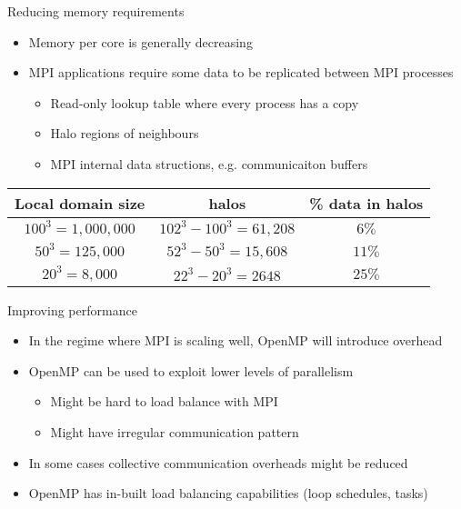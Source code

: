 \documentclass[aspectratio=43]{beamer}
\begin{document}
\begin{frame}[fragile]{Reducing memory requirements}
\begin{itemize}
\item Memory per core is generally decreasing
\item MPI applications require some data to be replicated between MPI processes 
 \begin{itemize}
        \item Read-only lookup table where every process has a copy
        \item Halo regions of neighbours          
        \item MPI internal data structions, e.g. communicaiton buffers
    \end{itemize}
\end{itemize}
\begin{center}
\begin{tabular}{|c|c|c|}
\hline
Local domain size &  halos & \% data in halos\\\hline
$100^3 = 1,000,000$  & $102^3 - 100^3 = 61,208$ & $6\%$\\\hline
$50^3 = 125,000$  &  $52^3 - 50^3 = 15,608$ & $11\%$ \\\hline
$20^3 = 8,000$  & $22^3 - 20^3 = 2648$  & $25\%$ \\\hline
\end{tabular}
\end{center}
\end{frame}

\begin{frame}[fragile]{Improving performance}
\begin{itemize}
\item In the regime where MPI is scaling well, OpenMP will introduce overhead
\item OpenMP can be used to exploit lower levels of parallelism
 \begin{itemize}
        \item Might be hard to load balance with MPI
        \item Might have irregular communication pattern
    \end{itemize}
\item In some cases collective communication overheads might be reduced
\item OpenMP has in-built load balancing capabilities (loop schedules, tasks)
\end{itemize}
\end{frame}
\end{document}
